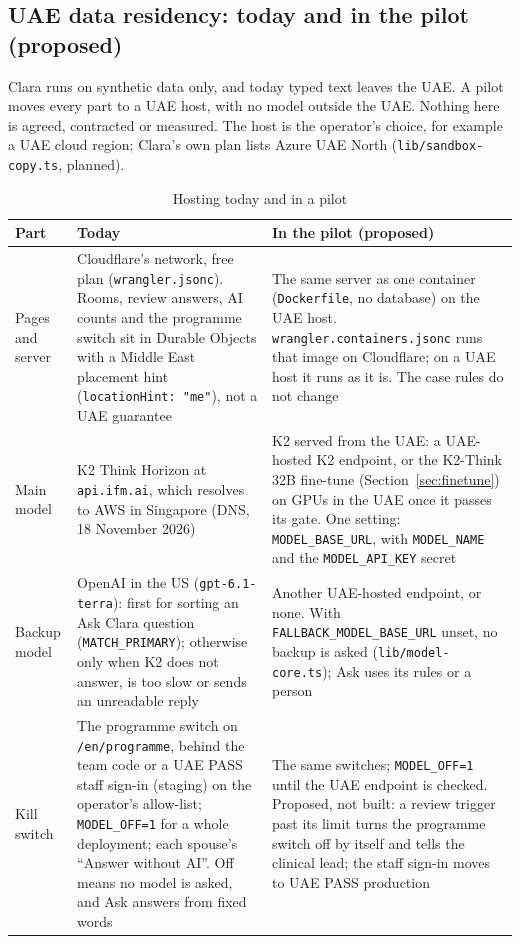 \documentclass[10.5pt,a4paper]{article}
\newcommand{\thead}[1]{\textbf{#1}}
\newcommand{\toprl}{\arrayrulecolor{ink}\toprule\arrayrulecolor{rule}}
\newcommand{\code}[1]{\texttt{\small #1}}
\newcommand{\file}[1]{\leavevmode\textcolor{muted}{\texttt{\small #1}}}
\begin{document}
\subsection{UAE data residency: today and in the pilot (proposed)}\label{sec:residency}

Clara runs on synthetic data only, and today typed text leaves the UAE. A pilot moves every part to a UAE host, with no
model outside the UAE. Nothing here is agreed, contracted or measured. The host is the operator's choice, for example a
UAE cloud region; Clara's own plan lists Azure UAE North (\file{lib/sandbox-copy.ts}, planned).

{\small
\begin{xltabular}{\textwidth}{@{}P{2.4cm}LL@{}}
\caption{Hosting today and in a pilot}\\
\toprl
\thead{Part} & \thead{Today} & \thead{In the pilot (proposed)}\\
\midrule
Pages and server & Cloudflare's network, free plan (\file{wrangler.jsonc}). Rooms, review answers, AI counts and the programme switch sit in Durable Objects with a Middle East placement hint (\code{locationHint: "me"}), not a UAE guarantee & The same server as one container (\file{Dockerfile}, no database) on the UAE host. \file{wrangler.containers.jsonc} runs that image on Cloudflare; on a UAE host it runs as it is. The case rules do not change\\
\midrule
Main model & K2 Think Horizon at \code{api.ifm.ai}, which resolves to AWS in Singapore (DNS, 18 November 2026) & K2 served from the UAE: a UAE-hosted K2 endpoint, or the K2-Think 32B fine-tune (Section~\ref{sec:finetune}) on GPUs in the UAE once it passes its gate. One setting: \code{MODEL\_BASE\_URL}, with \code{MODEL\_NAME} and the \code{MODEL\_API\_KEY} secret\\
\midrule
Backup model & OpenAI in the US (\code{gpt-6.1-terra}): first for sorting an Ask Clara question (\code{MATCH\_PRIMARY}); otherwise only when K2 does not answer, is too slow or sends an unreadable reply & Another UAE-hosted endpoint, or none. With \code{FALLBACK\_MODEL\_BASE\_URL} unset, no backup is asked (\file{lib/model-core.ts}); Ask uses its rules or a person\\
\midrule
Kill switch & The programme switch on \code{/en/programme}, behind the team code or a UAE PASS staff sign-in (staging) on the operator's allow-list; \code{MODEL\_OFF=1} for a whole deployment; each spouse's ``Answer without AI''. Off means no model is asked, and Ask answers from fixed words & The same switches; \code{MODEL\_OFF=1} until the UAE endpoint is checked. Proposed, not built: a review trigger past its limit turns the programme switch off by itself and tells the clinical lead; the staff sign-in moves to UAE PASS production\\

\end{xltabular}}
\end{document}
